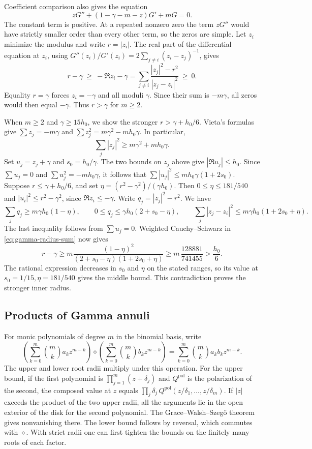 Coefficient comparison also gives the equation
\[
 zG''+(1-\gamma-m-z)G'+mG=0 .
\]
The constant term is positive. At a repeated nonzero zero the
term \(zG''\) would have strictly smaller order than every
other term, so the zeros are simple. Let \(z_i\) minimize
the modulus and write \(r=|z_i|\). The real part of the
differential equation at \(z_i\), using
\(G''(z_i)/G'(z_i)=2\sum_{j\ne i}(z_i-z_j)^{-1}\), gives
\begin{equation}\label{eq:gamma-radius-sum}
 r-\gamma\ \ge\ -\Re z_i-\gamma
  =\sum_{j\ne i}\frac{|z_j|^2-r^2}{|z_j-z_i|^2}\ \ge\ 0 .
\end{equation}
Equality \(r=\gamma\) forces \(z_i=-\gamma\) and all moduli
\(\gamma\). Since their sum is \(-m\gamma\), all zeros would
then equal \(-\gamma\). Thus \(r>\gamma\) for \(m\ge2\).

When \(m\ge2\) and \(\gamma\ge15h_0\), we show the stronger
\(r>\gamma+h_0/6\). Vieta's formulas give
\(\sum z_j=-m\gamma\) and
\(\sum z_j^2=m\gamma^2-mh_0\gamma\). In particular,
\[
 \sum_j |z_j|^2\ge m\gamma^2+mh_0\gamma .
\]
Set \(u_j=z_j+\gamma\) and \(s_0=h_0/\gamma\).
The two bounds on \(z_j\) above give \(|\Re u_j|\le h_0\).
Since \(\sum u_j=0\) and \(\sum u_j^2=-mh_0\gamma\), it
follows that \(\sum |u_j|^2\le mh_0\gamma(1+2s_0)\).
Suppose \(r\le\gamma+h_0/6\), and set
\(\eta=(r^2-\gamma^2)/(\gamma h_0)\). Then
\(0\le\eta\le181/540\) and
\(|u_i|^2\le r^2-\gamma^2\), since \(\Re z_i\le-\gamma\).
Write \(q_j=|z_j|^2-r^2\). We have
\[
 \sum_j q_j\ge m\gamma h_0(1-\eta),\qquad
 0\le q_j\le\gamma h_0(2+s_0-\eta),\qquad
 \sum_j |z_j-z_i|^2\le m\gamma h_0(1+2s_0+\eta).
\]
The last inequality follows from \(\sum u_j=0\).
Weighted Cauchy--Schwarz in \eqref{eq:gamma-radius-sum} now gives
\[
 r-\gamma\ge
 m\frac{(1-\eta)^2}{(2+s_0-\eta)(1+2s_0+\eta)}
 \ge m\,\frac{128881}{741455}>\frac{h_0}{6}.
\]
The rational expression decreases in \(s_0\) and \(\eta\)
on the stated ranges, so its value at \(s_0=1/15,\eta=181/540\)
gives the middle bound. This contradiction proves the stronger
inner radius.

\subsection{Products of Gamma annuli}

For monic polynomials of degree \(m\) in the binomial basis, write
\[
 \left(\sum_{k=0}^m\binom{m}{k}a_k z^{m-k}\right)\diamond
 \left(\sum_{k=0}^m\binom{m}{k}b_k z^{m-k}\right)
 =\sum_{k=0}^m\binom{m}{k}a_kb_k z^{m-k}.
\]
The upper and lower root radii multiply under this operation.
For the upper bound, if the first polynomial is
\(\prod_{j=1}^m(z+\delta_j)\) and \(Q^{\mathrm{pol}}\) is the
polarization of the second, the composed value at \(z\) equals
\(\prod_j\delta_j\, Q^{\mathrm{pol}}(z/\delta_1,\ldots,z/\delta_m)\).
If \(|z|\) exceeds the product of the two upper radii, all the
arguments lie in the open exterior of the disk for the second
polynomial. The Grace--Walsh--Szeg\H{o} theorem
\cite[Theorem~4.1]{wagner-stability} gives nonvanishing there.
The lower bound follows by reversal, which commutes with
\(\diamond\). With strict radii one can first tighten the
bounds on the finitely many roots of each factor.

